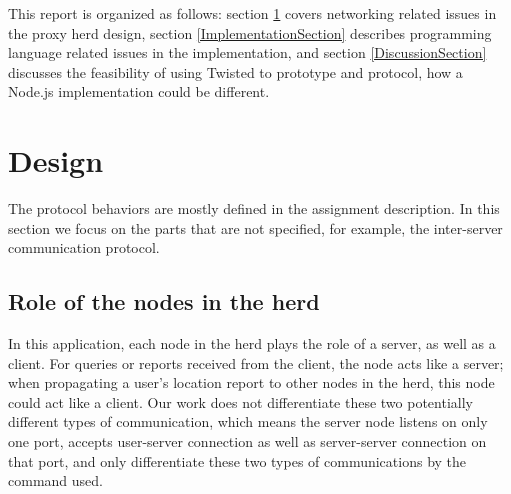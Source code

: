 \documentclass[letterpaper,twocolumn,10pt]{article}
\begin{document}
This report is organized as follows: section \ref{DesignSection} covers networking related issues in the proxy herd design, section \ref{ImplementationSection} describes programming language related issues in the implementation, and section \ref{DiscussionSection} discusses the feasibility of using Twisted to prototype and protocol, how a Node.js implementation could be different.

\section{Design}
\label{DesignSection}

The protocol behaviors are mostly defined in the assignment description\cite{AssignmentSite}. In this section we focus on the parts that are not specified, for example, the inter-server communication protocol.

\subsection{Role of the nodes in the herd} 
In this application, each node in the herd plays the role of a server, as well as a client. For queries or reports received from the client, the node acts like a server; when propagating a user's location report to other nodes in the herd, this node could act like a client. Our work does not differentiate these two potentially different types of communication, which means the server node listens on only one port, accepts user-server connection as well as server-server connection on that port, and only differentiate these two types of communications by the command used.
\end{document}
